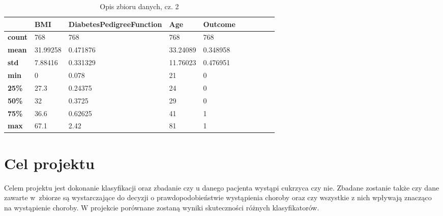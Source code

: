 \documentclass[12pt]{article}
\begin{document}
\begin{table}[]
	\caption{Opis zbioru danych, cz. 2}
	\label{table:opis2}
	\begin{tabular}{@{}llllllllll@{}}
		\toprule
		               & \textbf{BMI} & \textbf{DiabetesPedigreeFunction} & \textbf{Age} & \textbf{Outcome} & \textbf{} &   &   &   &   \\ \midrule
		\textbf{count} & 768          & 768                               & 768          & 768              &           &   &   &   &   \\
		\textbf{mean}  & 31.99258     & 0.471876                          & 33.24089     & 0.348958         &           &   &   &   &   \\
		\textbf{std}   & 7.88416      & 0.331329                          & 11.76023     & 0.476951         &           &   &   &   &   \\
		\textbf{min}   & 0            & 0.078                             & 21           & 0                &           &   &   &   &   \\
		\textbf{25\%}  & 27.3         & 0.24375                           & 24           & 0                &           &   &   &   &   \\
		\textbf{50\%}  & 32           & 0.3725                            & 29           & 0                &           &   &   &   &   \\
		\textbf{75\%}  & 36.6         & 0.62625                           & 41           & 1                &           &   &   &   &   \\
		\textbf{max}   & 67.1         & 2.42                              & 81           & 1                &           &   &   &   &   \\ \bottomrule
	\end{tabular}
\end{table}

\pagebreak
\section{Cel projektu}

Celem projektu jest dokonanie klasyfikacji oraz zbadanie czy u danego pacjenta wystąpi cukrzyca czy nie. Zbadane zostanie także czy dane zawarte w~zbiorze są wystarczające do decyzji o prawdopodobieństwie wystąpienia choroby oraz czy wszystkie z nich wpływają znacząco na wystąpienie choroby.
W projekcie porównane zostaną wyniki skuteczności różnych klasyfikatorów.
\end{document}

